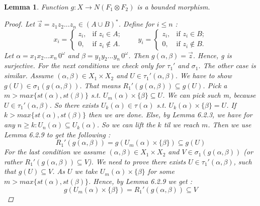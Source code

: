 \documentclass[12pt, a4paper]{scrartcl}
\newtheorem{lemma}[definition]{Lemma}
\begin{document}
\begin{lemma}
    Function $g : X \rightarrow N(F_1 \otimes F_2)$ is a bounded morphism.

    \begin{proof}
        Let $\vec{z} = z_1z_2...z_n \in (A \cup B)^*$. Define for $i \leq n$ :
        \[
            x_i = 
            \begin{cases}
            z_i, & \text{if } z_i \in A; \\
            0, & \text{if } z_i \notin A.
            \end{cases}
            \qquad
            y_i = 
            \begin{cases}
            z_i, & \text{if } z_i \in B; \\
            0, & \text{if } z_i \notin B.
            \end{cases}
        \] \newline
        Let $\alpha = x_1x_2...x_n \, 0^\omega$ and $\beta = y_1y_2...y_n \, 0^\omega$. Then $g(\alpha,\beta) = \vec{z}$. Hence, g is surjective. \newline \newline
        For the next conditions we check only for $\tau_1'$ and $\sigma_1$. The other case is similar.
        Assume $(\alpha,\beta) \in X_1 \times X_2$ and $U \in \tau_1'(\alpha, \beta)$. We have to show $g(U) \in \sigma_1(g(\alpha,\beta))$. That means $R_1'(g(\alpha,\beta)) \subseteq g(U)$.
        Pick a $m > max\{st(\alpha), st(\beta)\}$ s.t. $U_m(\alpha) \times \{\beta\} \subseteq U$. We can pick such m, because $U \in \tau_1'(\alpha,\beta)$. So there exists $U_k(\alpha) \in \tau(\alpha)$ s.t. $U_k(\alpha) \times \{\beta\} = U$.
        If $k > max\{st(\alpha), st(\beta)\}$ then we are done. Else, by Lemma 6.2.3, we have for any $n \geq k : U_n(\alpha) \subseteq U_k(\alpha)$. So we can lift the $k$ til we reach $m$. Then we use Lemma 6.2.9 to get the following :
        $$R_1'(g(\alpha,\beta)) = g(U_m(\alpha) \times \{\beta\}) \subseteq g(U)$$
        \newline
        For the last condition we assume $(\alpha, \beta) \in X_1 \times X_2$ and $V \in \sigma_1(g(\alpha,\beta))$ (or rather $R_1'(g(\alpha,\beta)) \subseteq V$).
        We need to prove there exists $U \in \tau_1'(\alpha,\beta)$, such that $g(U) \subseteq V$. As $U$ we take $U_m(\alpha) \times \{\beta\}$ for some $m > max\{st(\alpha), st(\beta)\}$. Hence, by Lemma 6.2.9 we get :
        $$g(U_m(\alpha) \times \{\beta\}) = R_1'(g(\alpha,\beta)) \subseteq V$$ 
    \end{proof}
    
\end{lemma} 
\end{document}
